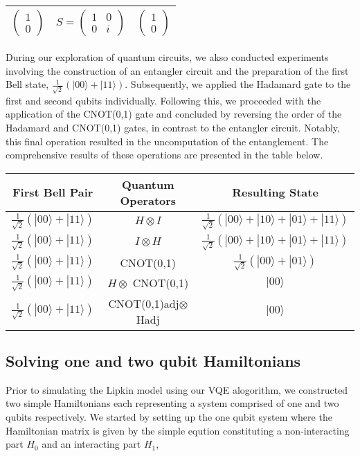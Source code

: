 \documentclass[onecolumn,10pt,cleanfoot]{asme2ej}
\begin{document}
\begin{center}
\begin{tabular}{|c|c|c|}
\hline
$\begin{pmatrix} 1 \\ 0 \end{pmatrix}$ & $S = \begin{pmatrix} 1 & 0 \\ 0 & i \end{pmatrix}$ & $\begin{pmatrix} 1 \\ 0 \end{pmatrix}$ \\
\hline
\end{tabular}
\end{center}

During our exploration of quantum circuits, we akso conducted experiments involving the construction of an entangler circuit and the preparation of the first Bell state, $\frac{1}{\sqrt{2}}(|00\rangle + |11\rangle)$. Subsequently, we applied the Hadamard gate to the first and second qubits individually. Following this, we proceeded with the application of the CNOT(0,1) gate and concluded by reversing the order of the Hadamard and CNOT(0,1) gates, in contrast to the entangler circuit. Notably, this final operation resulted in the uncomputation of the entanglement. The comprehensive results of these operations are presented in the table below.

\begin{center}
\begin{tabular}{|c|c|c|}
\hline
First Bell Pair & Quantum Operators & Resulting State \\
\hline
$\frac{1}{\sqrt{2}}(|00\rangle + |11\rangle)$ & $H \otimes I$ & $\frac{1}{\sqrt{2}}(|00\rangle + |10\rangle + |01\rangle + |11\rangle)$ \\
$\frac{1}{\sqrt{2}}(|00\rangle + |11\rangle)$ & $I \otimes H$ & $\frac{1}{\sqrt{2}}(|00\rangle + |10\rangle + |01\rangle + |11\rangle)$ \\
$\frac{1}{\sqrt{2}}(|00\rangle + |11\rangle)$ & CNOT(0,1) & $\frac{1}{\sqrt{2}}(|00\rangle + |01\rangle)$ \\
$\frac{1}{\sqrt{2}}(|00\rangle + |11\rangle)$ & $H \otimes$ CNOT(0,1) & $|00\rangle$ \\
$\frac{1}{\sqrt{2}}(|00\rangle + |11\rangle)$ & CNOT(0,1)adj$\otimes$Hadj & $|00\rangle$ \\
\hline
\end{tabular}
\end{center}

\subsection{Solving one and two qubit Hamiltonians} 
Prior to simulating the Lipkin model using our VQE alogorithm, we constructed two simple Hamiltonians each representing a system comprised of one and two qubits respectively. We started by setting up the one qubit system where the Hamiltonian matrix is given by the simple eqution constituting a non-interacting part $H_0$ and an interacting part $H_1$,  
\end{document}

